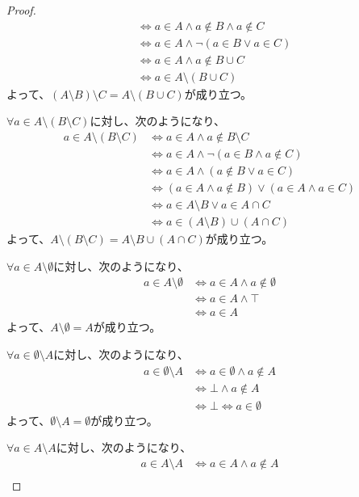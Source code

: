 \documentclass[a4paper]{jsarticle}
\begin{document}
\begin{proof}
\begin{align*}
&\Leftrightarrow a \in A \land a \notin B \land a \notin C\\
&\Leftrightarrow a \in A \land \neg(a \in B \vee a \in C)\\
&\Leftrightarrow a \in A \land a \notin B \cup C\\
&\Leftrightarrow a \in A \setminus (B \cup C)
\end{align*}
よって、$(A \setminus B) \setminus C = A \setminus (B \cup C)$が成り立つ。\par
$\forall a \in A \setminus (B \setminus C)$に対し、次のようになり、
\begin{align*}
a \in A \setminus (B \setminus C) &\Leftrightarrow a \in A \land a \notin B \setminus C\\
&\Leftrightarrow a \in A \land \neg(a \in B \land a \notin C)\\
&\Leftrightarrow a \in A \land (a \notin B \vee a \in C)\\
&\Leftrightarrow (a \in A \land a \notin B) \vee (a \in A \land a \in C)\\
&\Leftrightarrow a \in A \setminus B \vee a \in A \cap C\\
&\Leftrightarrow a \in (A \setminus B) \cup (A \cap C)
\end{align*}
よって、$A \setminus (B \setminus C) = A \setminus B \cup (A \cap C)$が成り立つ。\par
$\forall a \in A \setminus \emptyset$に対し、次のようになり、
\begin{align*}
a \in A \setminus \emptyset &\Leftrightarrow a \in A \land a \notin \emptyset \\ 
&\Leftrightarrow a \in A \land \top \\
&\Leftrightarrow a \in A
\end{align*}
よって、$A \setminus \emptyset = A$が成り立つ。\par
$\forall a \in \emptyset \setminus A$に対し、次のようになり、
\begin{align*}
a \in \emptyset \setminus A &\Leftrightarrow a \in \emptyset \land a \notin A \\
&\Leftrightarrow \bot \land a \notin A \\
&\Leftrightarrow \bot \Leftrightarrow a \in \emptyset
\end{align*}
よって、$\emptyset \setminus A = \emptyset$が成り立つ。\par
$\forall a \in A \setminus A$に対し、次のようになり、
\begin{align*}
a \in A \setminus A &\Leftrightarrow a \in A \land a \notin A \\

\end{align*}
\end{proof}
\end{document}
